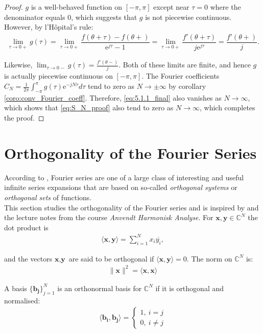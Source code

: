\begin{proof}
	$g$ is a well-behaved function on $[-\pi,\pi]$ except near 		$\tau = 0$ where the denominator equals 0, which suggests 		that $g$ is not piecewise continuous. However, by 				l'Hôpital's rule:
	\begin{align*}
		\lim_{\tau \to 0+} g(\tau) = \lim_{\tau \to 0+} 				\dfrac{f(\theta + \tau) - f(\theta+)}{\text{e}^{j				\tau}-1} = \lim_{\tau \to 0+} \dfrac{f'(\theta + \tau)}			{j\text{e}^{j\tau}} = \dfrac{f'(\theta+)}{j}.
	\end{align*}
	
	Likewise, $\displaystyle{\lim_{\tau \to 0-}} g(\tau) = 			\frac{f'(\theta-)}{j}$. Both of these limits are finite, 		and hence $g$ is actually piecewise continuous on $[-\pi,		\pi]$. The Fourier coefficients $C_N = \frac{1}{2\pi} 			\int_{-\pi}^\pi g(\tau)\text{e}^{-jN\tau} d\tau$ tend to 		zero as $N 	\to \pm \infty$ by corollary 						\ref{coro:conv_Fourier_coeff}. 	Therefore,
	\eqref{eq:5.1.1_final} also vanishes as $N \to \infty$, 		which shows that \eqref{eq:S_N_proof} also tend to zero as 		$N \to \infty$, which completes the proof.
\end{proof}

\section{Orthogonality of the Fourier Series} \label{sec:FS_ort}
According to \cite{page 62, FAA}, Fourier series are one of a large class of interesting and useful infinite series expansions that are based on so-called \textit{orthogonal systems} or \textit{orthogonal sets} of functions.\\
This section studies the orthogonality of the Fourier series and is inspired by \cite{pages 62-77, FAA} and the lecture notes from the course \textit{Anvendt Harmonisk Analyse}.
For $\textbf{x},\textbf{y} \in \mathbb{C}^N$ the dot product is
\begin{align*}
\langle \textbf{x},\textbf{y} \rangle = \sum_{i=1}^N x_i \overline{y_i},
\end{align*}

and the vectors $\textbf{x},\textbf{y}$ are said to be orthogonal if $\langle \textbf{x},\textbf{y} \rangle = 0$. The norm on $\mathbb{C}^N$ is:
\begin{align*}
\|\textbf{x}\|^2 = \langle \textbf{x},\textbf{x} \rangle
\end{align*}

A basis $\{\textbf{b}_\textbf{j}\}_{j=1}^N$ is an orthonormal basis for $\mathbb{C}^N$ if it is orthogonal and normalised:
\begin{align*}
\langle \textbf{b}_\textbf{i}, \textbf{b}_\textbf{j} \rangle =
\begin{cases}
	1, \ i = j \\
	0, \ i \neq j
\end{cases}
\end{align*}


